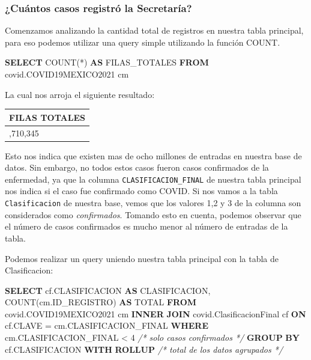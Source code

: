 \documentclass[11pt]{article}
\newenvironment{Shaded}{}{}
\newcommand{\KeywordTok}[1]{\textcolor[rgb]{0.00,0.44,0.13}{\textbf{{#1}}}}
\newcommand{\DecValTok}[1]{\textcolor[rgb]{0.25,0.63,0.44}{{#1}}}
\newcommand{\CommentTok}[1]{\textcolor[rgb]{0.38,0.63,0.69}{\textit{{#1}}}}
\newcommand{\FunctionTok}[1]{\textcolor[rgb]{0.02,0.16,0.49}{{#1}}}
\newcommand{\NormalTok}[1]{{#1}}
\newcommand{\OperatorTok}[1]{\textcolor[rgb]{0.40,0.40,0.40}{{#1}}}
\begin{document}
\hypertarget{cuuxe1ntos-casos-registruxf3-la-secretaruxeda}{%
\subsubsection{¿Cuántos casos registró la
Secretaría?}\label{cuuxe1ntos-casos-registruxf3-la-secretaruxeda}}

Comenzamos analizando la cantidad total de registros en nuestra tabla
principal, para eso podemos utilizar una query simple utilizando la
función COUNT.

\begin{Shaded}
\begin{Highlighting}[]
\KeywordTok{SELECT} 
    \FunctionTok{COUNT}\NormalTok{(}\OperatorTok{*}\NormalTok{) }\KeywordTok{AS}\NormalTok{ FILAS\_TOTALES}
\KeywordTok{FROM} 
\NormalTok{    covid.COVID19MEXICO2021 cm }
\end{Highlighting}
\end{Shaded}

La cual nos arroja el siguiente resultado:

\begin{longtable}[]{@{}l@{}}
\toprule\noalign{}
FILAS TOTALES \\
\midrule\noalign{}
\endhead
\bottomrule\noalign{}
\endlastfoot
8,710,345 \\
\end{longtable}

Esto nos indica que existen mas de ocho millones de entradas en nuestra
base de datos. Sin embargo, no todos estos casos fueron casos
confirmados de la enfermedad, ya que la columna
\texttt{CLASIFICACION\_FINAL} de nuestra tabla principal nos indica si
el caso fue confirmado como COVID. Si nos vamos a la tabla
\texttt{Clasificacion} de nuestra base, vemos que los valores 1,2 y 3 de
la columna son considerados como \emph{confirmados}. Tomando esto en
cuenta, podemos observar que el número de casos confirmados es mucho
menor al número de entradas de la tabla.

Podemos realizar un query uniendo nuestra tabla principal con la tabla
de Clasificacion:

\begin{Shaded}
\begin{Highlighting}[]
\KeywordTok{SELECT} 
\NormalTok{    cf.CLASIFICACION }\KeywordTok{AS}\NormalTok{ CLASIFICACION,}
    \FunctionTok{COUNT}\NormalTok{(cm.ID\_REGISTRO) }\KeywordTok{AS}\NormalTok{ TOTAL}
\KeywordTok{FROM} 
\NormalTok{    covid.COVID19MEXICO2021 cm }
\KeywordTok{INNER} \KeywordTok{JOIN} 
\NormalTok{    covid.ClasificacionFinal cf }\KeywordTok{ON}\NormalTok{ cf.CLAVE }\OperatorTok{=}\NormalTok{ cm.CLASIFICACION\_FINAL }
\KeywordTok{WHERE} 
\NormalTok{    cm.CLASIFICACION\_FINAL }\OperatorTok{\textless{}} \DecValTok{4} \CommentTok{/* solo casos confirmados */}
\KeywordTok{GROUP} \KeywordTok{BY}
\NormalTok{    cf.CLASIFICACION }\KeywordTok{WITH} \KeywordTok{ROLLUP} \CommentTok{/* total de los datos agrupados */}
\end{Highlighting}
\end{Shaded}
\end{document}
